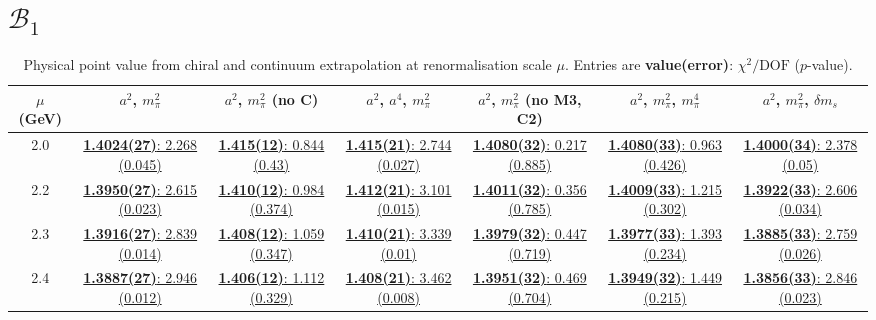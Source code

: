 \documentclass[12pt]{extarticle}
\begin{document}
\clearpage
\section{$\mathcal{B}_1$}
\begin{table}[h!]
\begin{center}
\begin{tabular}{|c|c|c|c|c|c|c|}
\hline
$\mu$ (GeV) & $a^2$, $m_\pi^2$& $a^2$, $m_\pi^2$ (no C)& $a^2$, $a^4$, $m_\pi^2$& $a^2$, $m_\pi^2$ (no M3, C2)& $a^2$, $m_\pi^2$, $m_\pi^4$& $a^2$, $m_\pi^2$, $\delta m_s$\\
\hline
2.0& \hyperlink{VVpAA/SUSY/a2m2_20.pdf.1}{\textbf{1.4024(27)}: 2.268 (0.045)} & \hyperlink{VVpAA/SUSY/a2m2noC_20.pdf.1}{\textbf{1.415(12)}: 0.844 (0.43)} & \hyperlink{VVpAA/SUSY/a2a4m2_20.pdf.1}{\textbf{1.415(21)}: 2.744 (0.027)} & \hyperlink{VVpAA/SUSY/a2m2mcut_20.pdf.1}{\textbf{1.4080(32)}: 0.217 (0.885)} & \hyperlink{VVpAA/SUSY/a2m2m4_20.pdf.1}{\textbf{1.4080(33)}: 0.963 (0.426)} & \hyperlink{VVpAA/SUSY/a2m2delm_20.pdf.1}{\textbf{1.4000(34)}: 2.378 (0.05)}\\
2.2& \hyperlink{VVpAA/SUSY/a2m2_22.pdf.1}{\textbf{1.3950(27)}: 2.615 (0.023)} & \hyperlink{VVpAA/SUSY/a2m2noC_22.pdf.1}{\textbf{1.410(12)}: 0.984 (0.374)} & \hyperlink{VVpAA/SUSY/a2a4m2_22.pdf.1}{\textbf{1.412(21)}: 3.101 (0.015)} & \hyperlink{VVpAA/SUSY/a2m2mcut_22.pdf.1}{\textbf{1.4011(32)}: 0.356 (0.785)} & \hyperlink{VVpAA/SUSY/a2m2m4_22.pdf.1}{\textbf{1.4009(33)}: 1.215 (0.302)} & \hyperlink{VVpAA/SUSY/a2m2delm_22.pdf.1}{\textbf{1.3922(33)}: 2.606 (0.034)}\\
2.3& \hyperlink{VVpAA/SUSY/a2m2_23.pdf.1}{\textbf{1.3916(27)}: 2.839 (0.014)} & \hyperlink{VVpAA/SUSY/a2m2noC_23.pdf.1}{\textbf{1.408(12)}: 1.059 (0.347)} & \hyperlink{VVpAA/SUSY/a2a4m2_23.pdf.1}{\textbf{1.410(21)}: 3.339 (0.01)} & \hyperlink{VVpAA/SUSY/a2m2mcut_23.pdf.1}{\textbf{1.3979(32)}: 0.447 (0.719)} & \hyperlink{VVpAA/SUSY/a2m2m4_23.pdf.1}{\textbf{1.3977(33)}: 1.393 (0.234)} & \hyperlink{VVpAA/SUSY/a2m2delm_23.pdf.1}{\textbf{1.3885(33)}: 2.759 (0.026)}\\
2.4& \hyperlink{VVpAA/SUSY/a2m2_24.pdf.1}{\textbf{1.3887(27)}: 2.946 (0.012)} & \hyperlink{VVpAA/SUSY/a2m2noC_24.pdf.1}{\textbf{1.406(12)}: 1.112 (0.329)} & \hyperlink{VVpAA/SUSY/a2a4m2_24.pdf.1}{\textbf{1.408(21)}: 3.462 (0.008)} & \hyperlink{VVpAA/SUSY/a2m2mcut_24.pdf.1}{\textbf{1.3951(32)}: 0.469 (0.704)} & \hyperlink{VVpAA/SUSY/a2m2m4_24.pdf.1}{\textbf{1.3949(32)}: 1.449 (0.215)} & \hyperlink{VVpAA/SUSY/a2m2delm_24.pdf.1}{\textbf{1.3856(33)}: 2.846 (0.023)}\\
\hline
\end{tabular}
\caption{Physical point value from chiral and continuum extrapolation at renormalisation scale $\mu$. Entries are \textbf{value(error)}: $\chi^2/\text{DOF}$ ($p$-value).}
\end{center}
\end{table}
\end{document}
